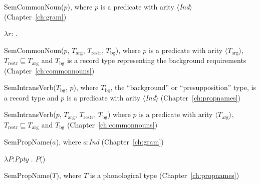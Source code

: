 SemCommonNoun($p$), where $p$ is a predicate with arity $\langle$\textit{Ind}$\rangle$ (Chapter~\ref{ch:gram})

$\lambda
r$:
. 

SemCommonNoun($p$,
$T_{\mathrm{arg}}$, $T_{\mathrm{restr}}$, $T_{\mathrm{bg}}$),
where $p$ is a predicate with arity $\langle T_{\mathrm{arg}}\rangle$,
$T_{\mathrm{restr}}\sqsubseteq T_{\mathrm{arg}}$ and
$T_{\mathrm{bg}}$ is a record type representing the background
requirements (Chapter~\ref{ch:commonnouns})


SemIntransVerb($T_{\mathrm{bg}}$, $p$), where $T_{\mathrm{bg}}$, the
``background'' or ``presupposition'' type, is a record type and $p$ is a predicate with arity $\langle$\textit{Ind}$\rangle$ (Chapter~\ref{ch:propnames})


SemIntransVerb($p$,
$T_{\mathrm{arg}}$, $T_{\mathrm{restr}}$, $T_{\mathrm{bg}}$) where $p$ is a predicate with arity $\langle T_{\mathrm{arg}}\rangle$,
$T_{\mathrm{restr}}\sqsubseteq T_{\mathrm{arg}}$ and
$T_{\mathrm{bg}}$ (Chapter~\ref{ch:commonnouns})



SemPropName($a$), where $a$:\textit{Ind} (Chapter~\ref{ch:gram})

$\lambda P$:\textit{Ppty} . $P$() 

SemPropName($T$), where $T$ is a phonological type
(Chapter~\ref{ch:propnames})

